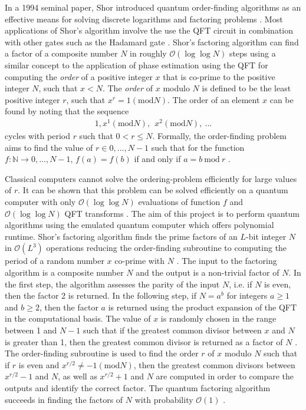 In a 1994 seminal paper, Shor introduced quantum order-finding algorithms as an effective means for solving discrete logarithms and factoring problems \cite{Shor1994}. Most applications of Shor's algorithm involve the use the QFT circuit in combination with other gates such as the Hadamard gate \cite{Zhang2019, Hlukhov2021}. Shor's factoring algorithm can find a factor of a composite number $N$ in roughly $\mathcal{O}(\log\log N)$ steps using a similar concept to the application of phase estimation using the QFT for computing the \textit{order} of a positive integer $x$ that is \gls{co-prime} to the positive integer $N$, such that $x < N$. The \textit{order} of $x$ modulo $N$ is defined to be the least positive integer $r$, such that $x^r = 1(\text{mod}N)$. The order of an element $x$ can be found by noting that the sequence 
\begin{align}
	1,x^1(\text{mod}N),~~x^2(\text{mod}N),~...\nonumber
\end{align}
cycles with period $r$ such that $0 < r \leq N$. Formally, the order-finding problem aims to find the value of $r\in {0,...,N-1}$ such that for the function $f:\mathbb{N} \rightarrow {0,...,N-1}$,  $f(a) = f(b)$ if and only if $a=b~\text{mod}~r$ \cite{DeWolf2019}.  

Classical computers cannot solve the ordering-problem efficiently for large values of $r$. It can be shown that this problem can be solved efficiently on a quantum computer with only $\mathcal{O}(\log\log N)$ evaluations of function $f$ and $\mathcal{O}(\log\log N)$ QFT transforms \cite{DeWolf2019}. The aim of this project is to perform quantum algorithms using the emulated quantum computer which offers polynomial runtime. Shor's factoring algorithm finds the prime factors of an $L$-bit integer $N$ in $\mathcal{O}(L^3)$ operations reducing the order-finding subroutine to computing the period of a random number $x$ \gls{co-prime} with $N$ \cite{Nielsen2010}. The input to the factoring algorithm is a composite number $N$ and the output is a non-trivial factor of $N$. In the first step, the algorithm assesses the parity of the input $N$, i.e. if $N$ is even, then the factor 2 is returned. In the following step, if $N = a^b$ for integers $a\geq1$ and $b\geq2$, then the factor $a$ is returned using the product expansion of the QFT in the computational basis. The value of $x$ is randomly chosen in the range between 1 and $N-1$ such that if the greatest common divisor between $x$ and $N$ is greater than 1, then the greatest common divisor is returned as a factor of $N$ \cite{Nielsen2010}. The order-finding subroutine is used to find the order $r$ of $x$ modulo $N$ such that if $r$ is even and $x^{r/2} \neq -1(\text{mod}N)$, then the greatest common divisors between $x^{r/2} - 1$ and $N$, as well as $x^{r/2} + 1$ and $N$ are computed in order to compare the outputs and identify the correct factor. The quantum factoring algorithm succeeds in finding the factors of $N$ with probability $\mathcal{O}(1)$ \cite{Nielsen2010}.  

